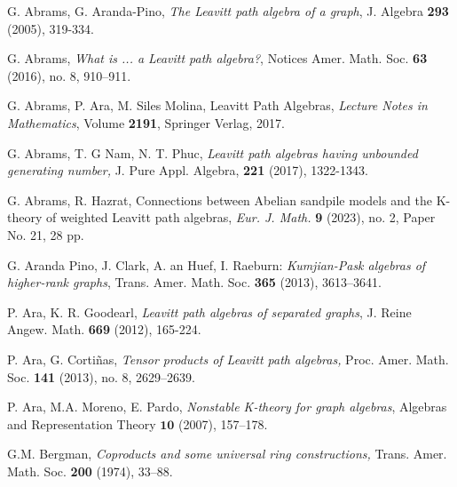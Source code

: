 \documentclass[a4paper, 11pt, reqno]{amsart}
\theoremstyle{definition}
\begin{document}
\begin{thebibliography}{}


 G. Abrams, G. Aranda-Pino, {\it The Leavitt path algebra of a graph}, J. Algebra {\bf 293} (2005), 319-334.

 G. Abrams, {\it What is ... a Leavitt path algebra?}, Notices Amer. Math. Soc. {\bf 63} (2016), no. 8, 910--911.


 G. Abrams, P. Ara, M. Siles Molina, Leavitt Path Algebras, {\it Lecture Notes in Mathematics}, Volume \textbf{2191}, Springer Verlag, 2017.


 G. Abrams, T. G Nam, N. T. Phuc, {\it Leavitt path algebras having unbounded generating number,}  J. Pure Appl. Algebra, {\bf 221} (2017), 1322-1343.

 G. Abrams, R. Hazrat, Connections between Abelian sandpile models and the K-theory of weighted Leavitt path algebras,  {\it Eur. J. Math.} {\bf 9} (2023), no. 2, Paper No. 21, 28 pp.


G. Aranda Pino, J. Clark, A. an Huef, I. Raeburn: \emph{Kumjian-Pask algebras of higher-rank graphs}, Trans. Amer. Math. Soc. \textbf{365} (2013), 3613--3641.

  P. Ara, K. R. Goodearl, {\it Leavitt path algebras of separated graphs},  J. Reine Angew. Math. {\bf 669} (2012), 165-224.


  P. Ara, G. Corti\~ nas, {\it Tensor products of Leavitt path algebras,} Proc. Amer. Math. Soc. {\bf 141} (2013), no. 8, 2629--2639. 

 P. Ara, M.A. Moreno, E. Pardo, {\it Nonstable K-theory for graph algebras}, Algebras and Representation Theory
$\mathbf{10}$ (2007), 157--178.




  G.M. Bergman, {\it Coproducts and some universal ring constructions,}  Trans. Amer. Math. Soc. {\bf 200} (1974), 33--88.



\end{thebibliography}
\end{document}

